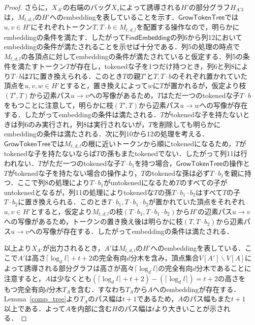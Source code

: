 \documentclass[master]{kuisthesis}		%
\theoremstyle{plain}
\theoremstyle{definition}
\begin{document}
\begin{proof}
さらに，$X_{A'}$の右端のバッグ$X_s$によって誘導される$H'$の部分グラフ$H_{A'3}$は，$M_{t, d, l}$の$H'$へのembeddingを表していることを示す．$\mathsf{GrowTokenTree}$では$u, v \in H'$にそれぞれトークン$T, T\cdot b \in M_{t, d, l}$を配置する操作なので，明らかにembeddingの条件を満たす．したがって$\mathsf{FindEmbedding}$の列6から列12においてembeddingの条件が満たされることを示せば十分である．列5の処理の時点で$M_{t, d, l}$の各頂点に対してembeddingの条件が満たされていると仮定する．列5の条件を満たすトークン$T$が存在し，tokenedな子を1つだけ持つとき，列6と列8により$T \cdot b$は$T$に置き換えられる．このとき$T$の親$T'$と$T, T \cdot b$のそれぞれ置かれていた頂点を$u, v, w \in H'$とすると，置き換えによって$w$に$T$が置かれるが，仮定より枝$(T', T)$から辺素パス$u \rightarrow v$への写像があるため，$T$はただ一つのtokenedな子$T \cdot b$をもつことに注意して，明らかに枝$(T', T)$から辺素パス$u \rightarrow w$への写像が存在する．したがってembeddingの条件は満たされる．$T$がtokenedな子を持たないときは列6のみ実行され，列8は実行されないが，$T$を削除しても明らかにembeddingの条件は満たされる．次に列10から12の処理を考える．$\mathsf{GrowTokenTree}$では$M_{t, d, l}$の根に近いトークンから順にtokenedになるため，$T$がtokenedな子を持たないならば$T$の孫もまたtokenedでない．したがって列11は行われない．$T$がただ一つのtokenedな子$T \cdot b_1$を持つ場合，$\mathsf{GrowTokenTree}$の操作と$T$がtokenedな子を持たない場合の操作より，$T$のtokenedな孫は必ず$T \cdot b_1$を親に持つ．ここで列8の処理により$T \cdot b_1$がuntokenedになるため$T$のすべての子がuntokenedとなるが，列11の処理によりtokenedな$T$の孫$T \cdot b_1 \cdot b_2$はすべて$T$の子$T \cdot b_2$に置き換えられる．このとき$T \cdot b_1, T \cdot b_1 \cdot b_2$が置かれていた頂点をそれぞれ$u, v \in H'$とすると，仮定より$M_{t, d, l}$の枝$(T \cdot b_1, T \cdot b_1 \cdot b_2)$から$H'$の辺素パス$u \rightarrow v$への写像があるため，トークンの置き換え後は明らかに枝$(T, T \cdot b_2)$から辺素パス$u \rightarrow v$への写像が存在する．したがってembeddingの条件は満たされる．

以上より$X_{A'}$が出力されるとき，$A'$は$M_{t, d, l}$の$H'$へのembeddingを表している．ここで$A'$は高さ$\lceil \log_d l \rceil +t+2$の完全有向$d$分木を含み，頂点集合$V[A'] \backslash V[A]$によって誘導される部分グラフは高さが高々$\lceil \log_d l \rceil$の完全有向$d$分木であることに注意すると，$A$は少なくとも$(\lceil \log_d l \rceil +t+2) -(\lceil \log_d l \rceil) = t+2$の高さをもつ完全有向$d$分木$T_A$を含む．すなわち$T_A$から$A$へのembeddingが存在する．Lemma~\ref{comp_tree}より$T_A$のパス幅は$t+1$であるため，$A$のパス幅もまた$t+1$以上である．よって$A$を内部に含む$H$のパス幅は$t$より大きいことが示される．


\end{proof}
\end{document}
